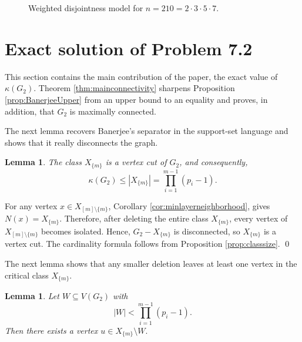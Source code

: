 \documentclass[12pt]{article}
\renewenvironment{proof}{{\bf \noindent Proof.}}{\qed}
\newtheorem{lemma}[theorem]{Lemma}
\theoremstyle{definition}
\begin{document}
\begin{figure}[H]
		\vspace*{-3mm}
		\caption{Weighted disjointness model for $n=210=2\cdot 3\cdot 5\cdot 7$.}
		\label{fig:n210model}
	\end{figure}
	
	
	
	\section{Exact solution of Problem 7.2}\label{sec:connectivity}
	 This section contains the main contribution of the paper, the exact value of $\kappa(G_2)$. Theorem \ref{thm:mainconnectivity} sharpens Proposition \ref{prop:BanerjeeUpper} from an upper bound to an equality and proves, in addition, that $G_2$ is maximally connected.
	
	\medskip
	 The next lemma recovers Banerjee's separator in the support-set language and shows that it really disconnects the graph.	
	\begin{lemma}\label{lem:separator}
		The class $X_{\{m\}}$ is a vertex cut of $G_2$, and consequently,
		$$
		\kappa(G_2)\leq |X_{\{m\}}|=\prod_{i=1}^{m-1}(p_i-1).
		$$
	\end{lemma}
	
	\begin{proof}
		For any vertex $x\in X_{[m]\setminus\{m\}}$, Corollary \ref{cor:minlayerneighborhood}, gives
		$ N(x)=X_{\{m\}}. $
		Therefore, after deleting the entire class $X_{\{m\}}$, every vertex of $X_{[m]\setminus\{m\}}$ becomes isolated. Hence, $G_2-X_{\{m\}}$ is disconnected, so $X_{\{m\}}$ is a vertex cut. The cardinality formula follows from Proposition \ref{prop:classsize}.
	\end{proof}
	
	\medskip
	The next lemma shows that any smaller deletion leaves at least one vertex in the critical class $X_{\{m\}}$.	
	\begin{lemma}\label{lem:survivingu}
		Let $W\subseteq V(G_2)$ with
		$$
		|W|<\prod_{i=1}^{m-1}(p_i-1).
		$$
		Then there exists a vertex
		$ u\in X_{\{m\}}\setminus W. $
	\end{lemma}
	
\end{document}
